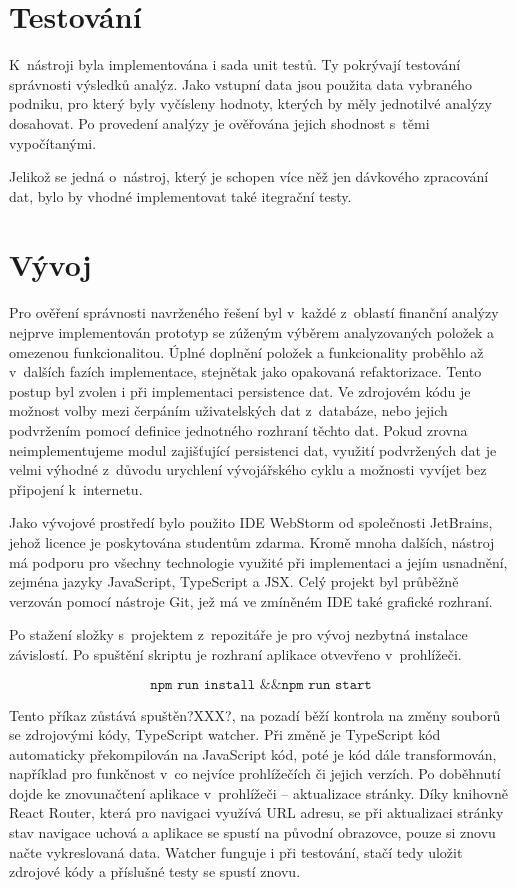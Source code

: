 \section{Testování}
K~nástroji byla implementována i sada unit testů. Ty pokrývají testování správnosti výsledků analýz. Jako vstupní data jsou použita data vybraného podniku, pro který byly vyčísleny hodnoty, kterých by měly jednotilvé analýzy dosahovat. Po provedení analýzy je ověřována jejich shodnost s~těmi vypočítanými.

Jelikož se jedná o~nástroj, který je schopen více něž jen dávkového zpracování dat, bylo by vhodné implementovat také itegrační testy.

\section{Vývoj}
Pro ověření správnosti navrženého řešení byl v~každé z~oblastí finanční analýzy nejprve implementován prototyp se zúženým výběrem analyzovaných položek a omezenou funkcionalitou. Úplné doplnění položek a funkcionality proběhlo až v~dalších fazích implementace, stejnětak jako opakovaná refaktorizace. Tento postup byl zvolen i při implementaci persistence dat. Ve zdrojovém kódu je možnost volby mezi čerpáním uživatelských dat z~databáze, nebo jejich podvržením pomocí definice jednotného rozhraní těchto dat. Pokud zrovna neimplementujeme modul zajišťující persistenci dat, využití podvržených dat je velmi výhodné z~důvodu urychlení vývojářského cyklu a možnosti vyvíjet bez připojení k~internetu.

Jako vývojové prostředí bylo použito IDE WebStorm od společnosti JetBrains, jehož licence je poskytována studentům zdarma. Kromě mnoha dalších, nástroj má podporu pro všechny technologie využité při implementaci a jejím usnadnění, zejména jazyky JavaScript, TypeScript a JSX. Celý projekt byl průběžně verzován pomocí nástroje Git, jež má ve zmíněném IDE také grafické rozhraní.

Po stažení složky s~projektem z~repozitáře je pro vývoj nezbytná instalace závislostí. Po spuštění skriptu je rozhraní aplikace otvevřeno v~prohlížeči.

$$\texttt{npm run install \&\& npm run start}$$

Tento příkaz zůstává spuštěn?XXX?, na pozadí běží kontrola na změny souborů se zdrojovými kódy, TypeScript watcher. Při změně je TypeScript kód automaticky překompilován na JavaScript kód, poté je kód dále transformován, například pro funkčnost v~co nejvíce prohlížečích či jejich verzích. Po doběhnutí dojde ke znovunačtení aplikace v~prohlížeči -- aktualizace stránky. Díky knihovně React Router, která pro navigaci využívá URL adresu, se při aktualizaci stránky stav navigace uchová a aplikace se spustí na původní obrazovce, pouze si znovu načte vykreslovaná data. Watcher funguje i při testování, stačí tedy uložit zdrojové kódy a příslušné testy se spustí znovu.

